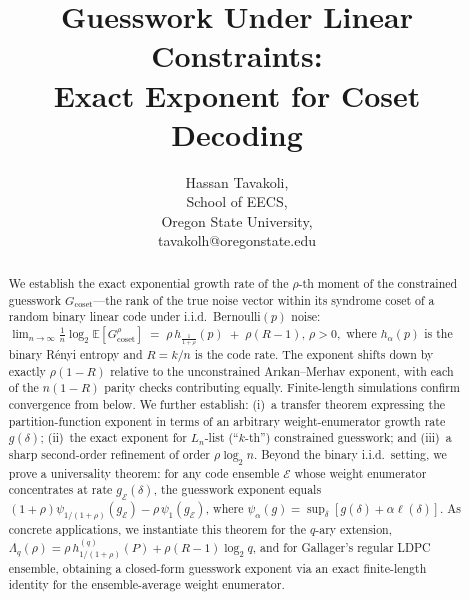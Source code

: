 \documentclass[journal,10pt,onecolumn]{IEEEtran}
\newcommand{\Eb}{\mathbb{E}}
\begin{document}
\title{Guesswork Under Linear Constraints: \\
Exact Exponent for Coset Decoding}

\author{Hassan Tavakoli,\\
School of EECS, \\
Oregon State University, \\
tavakolh@oregonstate.edu}

\maketitle

\begin{abstract}
We establish the exact exponential growth rate of the $\rho$-th moment
of the constrained guesswork $G_{\mathrm{coset}}$---the rank of the
true noise vector within its syndrome coset of a random binary linear
code under i.i.d.\ Bernoulli$(p)$ noise:
\(
    \lim_{n\to\infty}
    \frac{1}{n}\log_2\Eb\!\left[G_{\mathrm{coset}}^{\rho}\right]
    \;=\;
    \rho\,h_{\frac{1}{1+\rho}}(p)\;+\;\rho(R-1),
    \, \rho>0,
\)
where $h_\alpha(p)$ is the binary R\'{e}nyi entropy and $R=k/n$
is the code rate.
The exponent shifts down by exactly $\rho(1-R)$ relative to the
unconstrained Ar{\i}kan--Merhav exponent, with each of the $n(1-R)$
parity checks contributing equally.
Finite-length simulations confirm convergence from below.
We further establish: (i)~a transfer theorem expressing the
partition-function exponent in terms of an arbitrary weight-enumerator
growth rate $g(\delta)$; (ii)~the exact exponent for $L_n$-list
(``$k$-th'') constrained guesswork; and (iii)~a sharp second-order
refinement of order $\rho\log_2 n$.
Beyond the binary i.i.d.\ setting, we prove
a universality theorem: for any code ensemble $\mathcal{E}$ whose
weight enumerator concentrates at rate $g_{\mathcal{E}}(\delta)$,
the guesswork exponent equals
$(1+\rho)\psi_{1/(1+\rho)}(g_{\mathcal{E}})-\rho\,\psi_1(g_{\mathcal{E}})$,
where $\psi_\alpha(g)=\sup_\delta[g(\delta)+\alpha\ell(\delta)]$.
As concrete applications, we instantiate this theorem for the
$q$-ary extension,
$\Lambda_q(\rho)=\rho\,h^{(q)}_{1/(1+\rho)}(P)+\rho(R-1)\log_2 q$,
and for Gallager's regular LDPC ensemble, obtaining a closed-form
guesswork exponent via an exact finite-length identity for the
ensemble-average weight enumerator.
\end{abstract}
\end{document}
